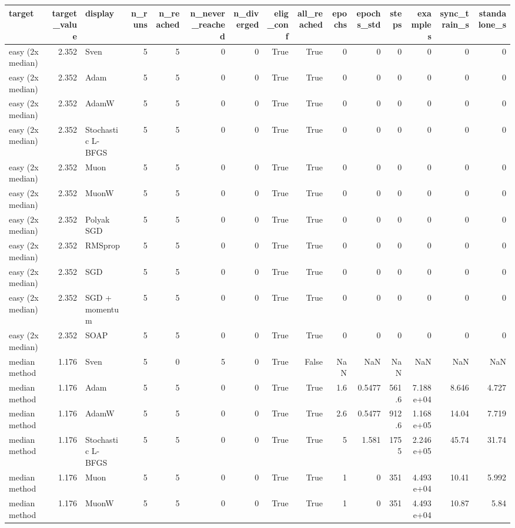 \begin{tabular}{lrlrrrrrrrrrrrr}
\toprule
target & target\_value & display & n\_runs & n\_reached & n\_never\_reached & n\_diverged & elig\_conf & all\_reached & epochs & epochs\_std & steps & examples & sync\_train\_s & standalone\_s \\
\midrule
easy (2x median) & 2.352 & Sven & 5 & 5 & 0 & 0 & True & True & 0 & 0 & 0 & 0 & 0 & 0 \\
easy (2x median) & 2.352 & Adam & 5 & 5 & 0 & 0 & True & True & 0 & 0 & 0 & 0 & 0 & 0 \\
easy (2x median) & 2.352 & AdamW & 5 & 5 & 0 & 0 & True & True & 0 & 0 & 0 & 0 & 0 & 0 \\
easy (2x median) & 2.352 & Stochastic L-BFGS & 5 & 5 & 0 & 0 & True & True & 0 & 0 & 0 & 0 & 0 & 0 \\
easy (2x median) & 2.352 & Muon & 5 & 5 & 0 & 0 & True & True & 0 & 0 & 0 & 0 & 0 & 0 \\
easy (2x median) & 2.352 & MuonW & 5 & 5 & 0 & 0 & True & True & 0 & 0 & 0 & 0 & 0 & 0 \\
easy (2x median) & 2.352 & Polyak SGD & 5 & 5 & 0 & 0 & True & True & 0 & 0 & 0 & 0 & 0 & 0 \\
easy (2x median) & 2.352 & RMSprop & 5 & 5 & 0 & 0 & True & True & 0 & 0 & 0 & 0 & 0 & 0 \\
easy (2x median) & 2.352 & SGD & 5 & 5 & 0 & 0 & True & True & 0 & 0 & 0 & 0 & 0 & 0 \\
easy (2x median) & 2.352 & SGD + momentum & 5 & 5 & 0 & 0 & True & True & 0 & 0 & 0 & 0 & 0 & 0 \\
easy (2x median) & 2.352 & SOAP & 5 & 5 & 0 & 0 & True & True & 0 & 0 & 0 & 0 & 0 & 0 \\
median method & 1.176 & Sven & 5 & 0 & 5 & 0 & True & False & NaN & NaN & NaN & NaN & NaN & NaN \\
median method & 1.176 & Adam & 5 & 5 & 0 & 0 & True & True & 1.6 & 0.5477 & 561.6 & 7.188e+04 & 8.646 & 4.727 \\
median method & 1.176 & AdamW & 5 & 5 & 0 & 0 & True & True & 2.6 & 0.5477 & 912.6 & 1.168e+05 & 14.04 & 7.719 \\
median method & 1.176 & Stochastic L-BFGS & 5 & 5 & 0 & 0 & True & True & 5 & 1.581 & 1755 & 2.246e+05 & 45.74 & 31.74 \\
median method & 1.176 & Muon & 5 & 5 & 0 & 0 & True & True & 1 & 0 & 351 & 4.493e+04 & 10.41 & 5.992 \\
median method & 1.176 & MuonW & 5 & 5 & 0 & 0 & True & True & 1 & 0 & 351 & 4.493e+04 & 10.87 & 5.84 \\

\end{tabular}
